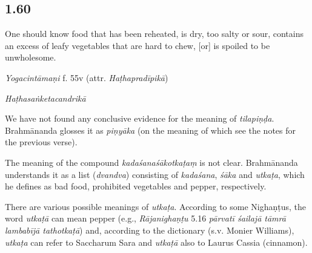 \begin{ekdosis}
\subsection*{1.60}
\begin{translation}[hp01_060]
One should know food that has been reheated, is dry, too salty or sour, contains an excess of leafy vegetables that are hard to chew, [or] is spoiled to be unwholesome.
\end{translation}


\begin{testimonia}[hp01_060]
\emph{Yogacintāmaṇi} f. 55v (attr. \emph{Haṭhapradīpikā})

\begin{versinnote}
\end{versinnote}

\emph{Haṭhasaṅketacandrikā}

\begin{versinnote}
\end{versinnote}

\end{testimonia}

\begin{philcomm}[hp01_060]
We have not found any conclusive evidence for the meaning of \emph{tilapiṇḍa}. Brahmānanda glosses it as \emph{piṇyāka} (on the meaning of which see the notes for the previous verse).

The meaning of the compound \emph{kadaśanaśākotkaṭaṃ} is not clear. Brahmānanda understands it as a list (\emph{dvandva}) consisting of \emph{kadaśana}, \emph{śāka} and \emph{utkaṭa}, which he defines as bad food, prohibited vegetables and pepper, respectively.

There are various possible meanings of \emph{utkaṭa}. According to some Nighaṇṭus, the word \emph{utkaṭā} can mean pepper  (e.g., \emph{Rājanighaṇṭu} 5.16 \emph{pārvatī śailajā tāmrā lambabījā tathotkaṭā}) and, according to the dictionary (s.v. Monier Williams), \emph{utkaṭa} can refer to Saccharum Sara and \emph{utkaṭā} also to Laurus Cassia (cinnamon). 


\end{philcomm}
\end{ekdosis}
